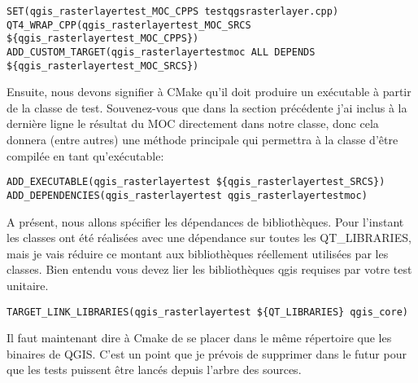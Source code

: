 \begin{verbatim}
SET(qgis_rasterlayertest_MOC_CPPS testqgsrasterlayer.cpp)
QT4_WRAP_CPP(qgis_rasterlayertest_MOC_SRCS ${qgis_rasterlayertest_MOC_CPPS})
ADD_CUSTOM_TARGET(qgis_rasterlayertestmoc ALL DEPENDS ${qgis_rasterlayertest_MOC_SRCS})
\end{verbatim}

Ensuite, nous devons signifier à CMake qu'il doit produire un exécutable à partir de la classe de test. Souvenez-vous que dans la section précédente j'ai inclus à la dernière ligne le résultat du MOC directement dans notre classe, donc cela donnera (entre autres) une méthode principale qui permettra à la classe d'être compilée en tant qu'exécutable:

\begin{verbatim}
ADD_EXECUTABLE(qgis_rasterlayertest ${qgis_rasterlayertest_SRCS})
ADD_DEPENDENCIES(qgis_rasterlayertest qgis_rasterlayertestmoc)
\end{verbatim}

A présent, nous allons spécifier les dépendances de bibliothèques. Pour l'instant les classes ont été réalisées avec une dépendance sur toutes les QT\_LIBRARIES, mais je vais réduire ce montant aux bibliothèques réellement utilisées par les classes. Bien entendu vous devez lier les bibliothèques qgis requises par votre test unitaire.

\begin{verbatim}
TARGET_LINK_LIBRARIES(qgis_rasterlayertest ${QT_LIBRARIES} qgis_core)
\end{verbatim}

Il faut maintenant dire à Cmake de se placer dans le même répertoire que les binaires de QGIS. C'est un point que je prévois de supprimer dans le futur pour que les tests puissent être lancés depuis l'arbre des sources.

